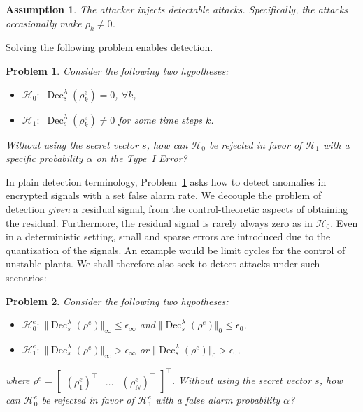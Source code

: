 \documentclass[journal, twoside, web]{ieeecolorpreprint}
\newtheorem{prob}{Problem}
\newtheorem{asm}{Assumption}
\DeclareMathOperator{\dec}{Dec}
\begin{document}
\begin{asm}\label{asm:detectable}
The attacker injects detectable attacks. Specifically, the attacks occasionally make $\rho_k \neq 0$.
\end{asm}
Solving the following problem enables detection.
\begin{prob}\label{prob:main}
    Consider the following two hypotheses:
    \begin{itemize}
        \item $\mathcal{H}_0:$ $\dec^\lambda_s( \rho_k^e)=0$, $\forall k$,
        \item $\mathcal{H}_1:$ $\dec^\lambda_s( \rho_k^e)\neq 0$ for some time steps $k$.
    \end{itemize}
    Without using the secret vector $s$, how can $\mathcal{H}_0$ be rejected in favor of $\mathcal{H}_1$ with a specific probability $\alpha$ on the Type~I Error?
\end{prob}

In plain detection terminology, Problem~\ref{prob:main} asks how to detect anomalies in encrypted signals with a set false alarm rate. We decouple the problem of detection \emph{given} a residual signal, from the control-theoretic aspects of obtaining the residual. Furthermore, the residual signal is rarely always zero as in $\mathcal{H}_0$. Even in a deterministic setting, small and sparse errors are introduced due to the quantization of the signals. An example would be limit cycles for the control of unstable plants. We shall therefore also seek to detect attacks under such scenarios:
\begin{prob}\label{prob:secondary}
    Consider the following two hypotheses:
    \begin{itemize}
        \item $\mathcal{H}_0^e:$ $\Vert \dec^\lambda_s( \rho^e)\Vert _\infty \leq \epsilon_\infty$ and $\Vert \dec^\lambda_s( \rho^e)\Vert_0 \leq \epsilon_0$,
        \item $\mathcal{H}_1^e:$ $\Vert \dec^\lambda_s( \rho^e)\Vert _\infty > \epsilon_\infty$ or  $\Vert \dec^\lambda_s( \rho^e)\Vert _0 > \epsilon_0$,
    \end{itemize}
    where $\rho^e= \begin{bmatrix}\left(\rho_1^e\right )^\top & \dots & \left(\rho_N^e \right)^\top \end{bmatrix}^\top$. Without using the secret vector $s$, how can $\mathcal{H}^e_0$ be rejected in favor of $\mathcal{H}^e_1$ with a false alarm probability $\alpha$?
\end{prob}
\end{document}
